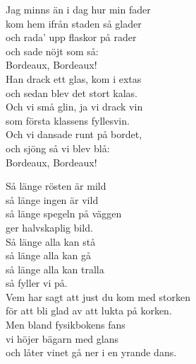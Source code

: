 \documentclass[a6paper,10pt]{article}
\begin{document}
\setlength{\oddsidemargin}{-0.47in}
\noindent
\begin{center}
\end{center}
\begin{lyrics}
Jag minns än i dag hur min fader\\
kom hem ifrån staden så glader\\
och rada' upp flaskor på rader\\
och sade nöjt som så:\\
Bordeaux, Bordeaux!
\vspace{5pt}\\
Han drack ett glas, kom i extas\\
och sedan blev det stort kalas.\\
Och vi små glin, ja vi drack vin\\
som första klassens fyllesvin.\\
Och vi dansade runt på bordet,\\
och sjöng så vi blev blå:\\
Bordeaux, Bordeaux!
\end{lyrics}
\vspace{20pt}
\begin{center}
\end{center}
\begin{lyrics}
Så länge rösten är mild\\
så länge ingen är vild\\
så länge spegeln på väggen\\
ger halvskaplig bild.\\
Så länge alla kan stå\\
så länge alla kan gå\\
så länge alla kan tralla\\
så fyller vi på.
\vspace{5pt}\\
Vem har sagt att just du kom med storken\\
för att bli glad av att lukta på korken.\\
Men bland fysikbokens fans\\
vi höjer bägarn med glans\\
och låter vinet gå ner i en yrande dans.
\end{lyrics}
\end{document}
